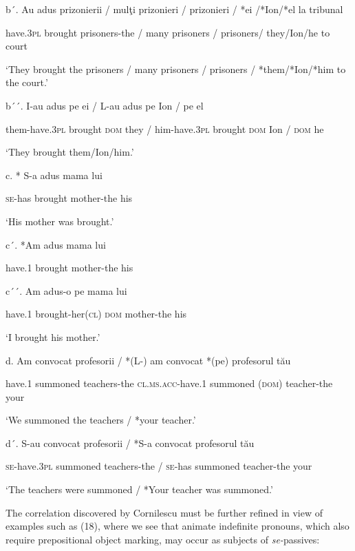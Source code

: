 \documentclass[output=paper]{langsci/langscibook}
\begin{document}
b´.   Au          adus     prizonierii    / mulţi prizonieri  / prizonieri / *ei /*Ion/*el la tribunal

have.\textsc{3pl} brought prisoners-the / many prisoners / prisoners/ they/Ion/he    to court

‘They brought the prisoners / many prisoners / prisoners / *them/*Ion/*him to the court.’

b´´.   I-au                 adus      pe    ei    /   L-au               adus      pe    Ion /   pe    el

       them-have.3\textsc{pl} brought \textsc{dom} they /  him-have.3\textsc{pl} brought \textsc{dom} Ion /  \textsc{dom} he

       ‘They brought them/Ion/him.’ 

c.   * S-a     adus      mama         lui

        \textsc{se-}has brought mother-the his

         ‘His mother was brought.’

c´.   *Am      adus     mama         lui

         have.1 brought mother-the his

c´´.   Am      adus-o               pe    mama         lui

        have.1 brought-her(\textsc{cl}) \textsc{dom} mother-the his

          ‘I brought his mother.’

d.   Am     convocat     profesorii  / *(L-)             am      convocat  *(pe)     profesorul  tău

have.1 summoned teachers-the   \textsc{cl.ms.acc-}have.1 summoned \textsc{(dom)} teacher-the your

                  ‘We summoned the teachers / *your teacher.’

  d´.   S-au            convocat   profesorii     / *S-a convocat        profesorul   tău

        \textsc{se-}have.3\textsc{pl} summoned teachers-the / \textsc{se-}has summoned teacher-the your

                 ‘The teachers were summoned / *Your teacher was summoned.’

The correlation discovered by Cornilescu must be further refined in view of examples such as (18), where we see that animate indefinite pronouns, which also require prepositional object marking, may occur as subjects of \textit{se-}passives:

\ea%
    \label{ex:key:18}
    \gll\\
        \\
    \glt
    \z
\end{document}
